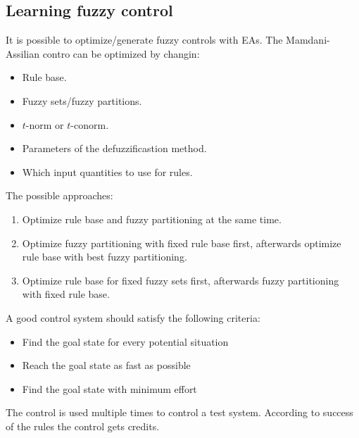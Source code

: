\documentclass{article}
\begin{document}
\subsection{Learning fuzzy control}
It is possible to optimize/generate fuzzy controls with EAs. The Mamdani-Assilian contro can be
optimized by changin:
\begin{itemize}
    \item Rule base.
    \item Fuzzy sets/fuzzy partitions.
    \item $t$-norm or $t$-conorm.
    \item Parameters of the defuzzificastion method.
    \item Which input quantities to use for rules.
\end{itemize}
The possible approaches:
\begin{enumerate}
    \item Optimize rule base and fuzzy partitioning at the same time.
    \item Optimize fuzzy partitioning with fixed rule base first, afterwards optimize rule base with
          best fuzzy partitioning.
    \item Optimize rule base for fixed fuzzy sets first, afterwards fuzzy partitioning with fixed rule
          base.
\end{enumerate}
A good control system should satisfy the following criteria:
\begin{itemize}
    \item Find the goal state for every potential situation
    \item Reach the goal state as fast as possible
    \item Find the goal state with minimum effort
\end{itemize}
The control is used multiple times to control a test system. According to success of the rules the control
gets credits.
\end{document}
